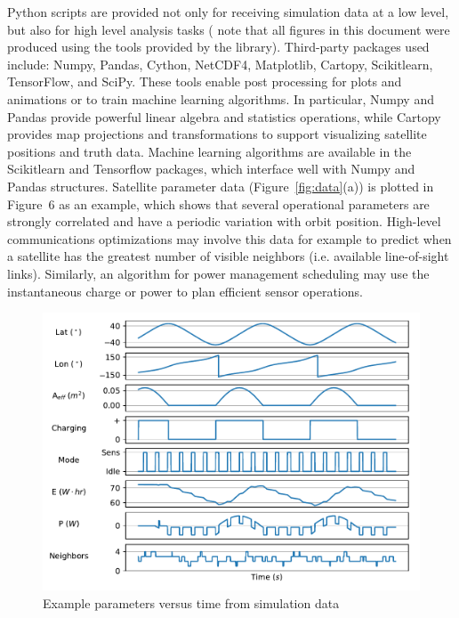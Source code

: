 \documentclass[conference]{IEEEtran}
\begin{document}
Python scripts are provided not only for receiving simulation data at a low
level, but also for high level analysis tasks ( note that all figures in this
document were produced using the tools provided by the library).  
Third-party packages used include: Numpy, Pandas, Cython, NetCDF4,
Matplotlib, Cartopy, Scikitlearn, TensorFlow, and SciPy.  These tools enable post
processing for plots and animations or to train machine learning algorithms.
In particular, Numpy and Pandas provide powerful linear algebra and statistics operations, while
Cartopy provides map projections and transformations to support
visualizing satellite positions and truth data.  Machine learning algorithms are
available in the Scikitlearn and Tensorflow packages, which interface well with
Numpy and Pandas structures.  Satellite parameter data
(Figure~\ref{fig:data}(a)) is plotted in Figure~6 as an example, %
which shows that several operational parameters are strongly correlated and have a periodic
variation with orbit position.  High-level communications optimizations may involve this data
for example to predict when a satellite has the greatest number of visible neighbors (i.e. available
line-of-sight links).  Similarly, an algorithm for power management scheduling may use the
instantaneous charge or power to plan efficient sensor operations.

\begin{figure}[t]
  \begin{center}
    \includegraphics[width=0.9\linewidth]{images/param_plot.pdf}
  \caption{Example parameters versus time from simulation data}
  \end{center}
  \label{fig:processing}
\end{figure}
\end{document}

